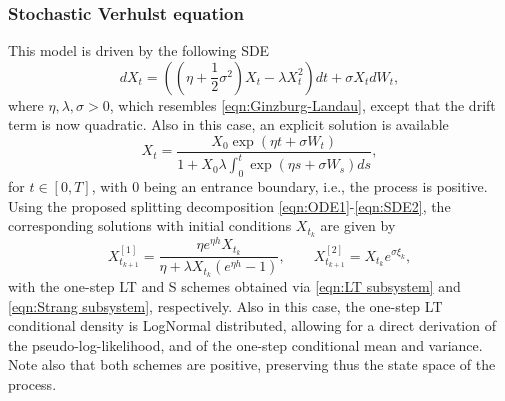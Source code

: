 \documentclass[a4paper,12pt]{article}
\numberwithin{equation}{section}
\theoremstyle{plain}
\theoremstyle{definition}
\begin{document}
\begin{appendix}
\subsubsection{Stochastic Verhulst equation}
This model is driven by the following SDE
\begin{equation}\label{eqn:Verhulst SDE}
    dX_t=\left((\eta+\frac{1}{2}\sigma^2)X_t-\lambda X_t^2\right)dt+\sigma X_t dW_t,
\end{equation}
where $\eta,\lambda,\sigma>0$, which resembles \eqref{eqn:Ginzburg-Landau}, except that the drift term is now quadratic. Also in this case, an explicit solution is available \cite{kloeden_numerical_1992}
\begin{equation}
    X_t=\frac{X_0 \exp \left(\eta t+\sigma W_t\right)}{1+X_0 \lambda \int_0^t \exp \left(\eta s+\sigma W_s\right) d s},
\end{equation}
for $t\in[0,T]$, with $0$ being an entrance boundary, i.e., the process is positive. Using the proposed splitting decomposition \eqref{eqn:ODE1}-\eqref{eqn:SDE2}, the corresponding solutions with initial conditions $X_{t_k}$ are given by
\[X^{[1]}_{t_{k+1}}=\frac{\eta e^{\eta h}X_{t_k}}{\eta+\lambda X_{t_k}(e^{\eta h}-1)},\qquad 
X^{[2]}_{t_{k+1}}=X_{t_k}e^{\sigma \xi_k},
\]
with the one-step LT and S schemes obtained via \eqref{eqn:LT subsystem} and \eqref{eqn:Strang subsystem}, respectively. Also in this case, the one-step LT conditional density is LogNormal distributed, allowing for a direct derivation of the pseudo-log-likelihood, and of the one-step conditional mean and variance. Note also that both schemes are positive, preserving thus the state space of the process.
\end{appendix}
\end{document}
